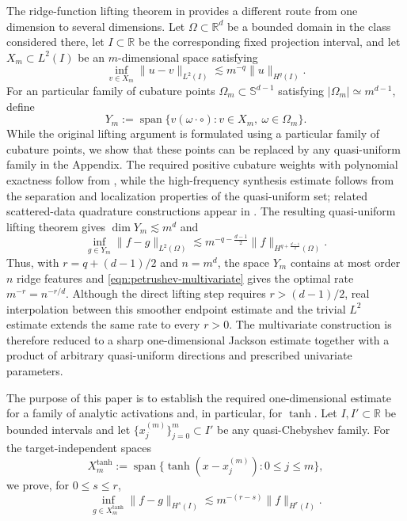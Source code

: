 \documentclass{article}
\numberwithin{equation}{section}
\def\RR{\mathbb{R}}
\def\SS{\mathbb{S}}
\begin{document}
The ridge-function lifting theorem in \cite{petrushev1998approximation} provides a different route from one dimension to several dimensions. Let $\Omega\subset\RR^d$ be a bounded domain in the class considered there, let $I\subset\RR$ be the corresponding fixed projection interval, and let $X_m\subset L^2(I)$ be an $m$-dimensional space satisfying
\begin{equation}\label{eqn:petrushev-univariate}
    \inf_{v\in X_m}\|u-v\|_{L^2(I)}
    \lesssim m^{-q}\|u\|_{H^q(I)}.
\end{equation}
For an particular family of cubature points $\Omega_m\subset\SS^{d-1}$ satisfying $|\Omega_m|\simeq m^{d-1}$, define
\begin{equation*}
    Y_m:=\operatorname{span}\{v(\omega\cdot\circ):v\in X_m,\ \omega\in\Omega_m\}.
\end{equation*}
While the original lifting argument is formulated using a particular family of cubature points, we show that these points can be replaced by any quasi-uniform family in the Appendix. The required positive cubature weights with polynomial exactness follow from \cite{narcowich2006localized}, while the high-frequency synthesis estimate follows from the separation and localization properties of the quasi-uniform set; related scattered-data quadrature constructions appear in \cite{leGiaMhaskar2009localized}. The resulting quasi-uniform lifting theorem gives $\dim Y_m\lesssim m^d$ and
\begin{equation}\label{eqn:petrushev-multivariate}
    \inf_{g\in Y_m}\|f-g\|_{L^2(\Omega)}
    \lesssim
    m^{-q-\frac{d-1}{2}}
    \|f\|_{H^{q+\frac{d-1}{2}}(\Omega)}.
\end{equation}
Thus, with $r=q+(d-1)/2$ and $n=m^d$, the space $Y_m$ contains at most order $n$ ridge features and \eqref{eqn:petrushev-multivariate} gives the optimal rate $m^{-r}=n^{-r/d}$. Although the direct lifting step requires $r>(d-1)/2$, real interpolation between this smoother endpoint estimate and the trivial $L^2$ estimate extends the same rate to every $r>0$. The multivariate construction is therefore reduced to a sharp one-dimensional Jackson estimate together with a product of arbitrary quasi-uniform directions and prescribed univariate parameters.

The purpose of this paper is to establish the required one-dimensional estimate for a family of analytic activations and, in particular, for $\tanh$. Let $I,I'\subset\RR$ be bounded intervals and let $\{x_j^{(m)}\}_{j=0}^m\subset I'$ be any quasi-Chebyshev family. For the target-independent spaces
\begin{equation*}
    X_m^{\tanh}
    :=\operatorname{span}\{\tanh(x-x_j^{(m)}):0\leq j\leq m\},
\end{equation*}
we prove, for $0\leq s\leq r$,
\begin{equation}\label{eqn:intro-main-result}
    \inf_{g\in X_m^{\tanh}}
    \|f-g\|_{H^s(I)}
    \lesssim
    m^{-(r-s)}\|f\|_{H^r(I)}.
\end{equation}
\end{document}
